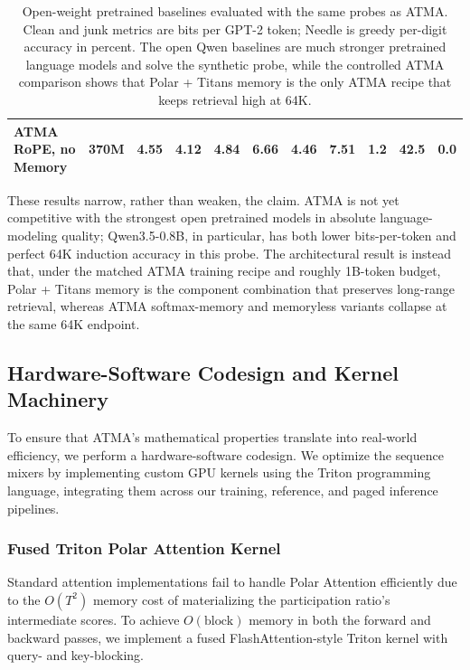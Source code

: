 \documentclass{article} %
\begin{document}
\begin{table}[t]
{\begin{tabular}{lrrrrrrrrrr}
ATMA RoPE, no Memory & 370M & 4.55 & 4.12 & 4.84 & 6.66 & 4.46 & 7.51 & 1.2 & 42.5 & 0.0 \\
\bottomrule
\end{tabular}
}
\caption{Open-weight pretrained baselines evaluated with the same probes as ATMA. Clean and junk metrics are bits per GPT-2 token; Needle is greedy per-digit accuracy in percent. The open Qwen baselines are much stronger pretrained language models and solve the synthetic probe, while the controlled ATMA comparison shows that Polar + Titans memory is the only ATMA recipe that keeps retrieval high at 64K.}
\label{table:open_weight_baselines}
\end{table}
\FloatBarrier

These results narrow, rather than weaken, the claim. ATMA is not yet competitive with the strongest open pretrained models in absolute language-modeling quality; Qwen3.5-0.8B, in particular, has both lower bits-per-token and perfect 64K induction accuracy in this probe. The architectural result is instead that, under the matched ATMA training recipe and roughly 1B-token budget, Polar + Titans memory is the component combination that preserves long-range retrieval, whereas ATMA softmax-memory and memoryless variants collapse at the same 64K endpoint.

\subsection{Hardware-Software Codesign and Kernel Machinery}
To ensure that ATMA's mathematical properties translate into real-world efficiency, we perform a hardware-software codesign. We optimize the sequence mixers by implementing custom GPU kernels using the Triton programming language, integrating them across our training, reference, and paged inference pipelines.

\subsubsection{Fused Triton Polar Attention Kernel}
Standard attention implementations fail to handle Polar Attention efficiently due to the $O(T^2)$ memory cost of materializing the participation ratio's intermediate scores. To achieve $O(\text{block})$ memory in both the forward and backward passes, we implement a fused FlashAttention-style Triton kernel with query- and key-blocking.
\end{document}
